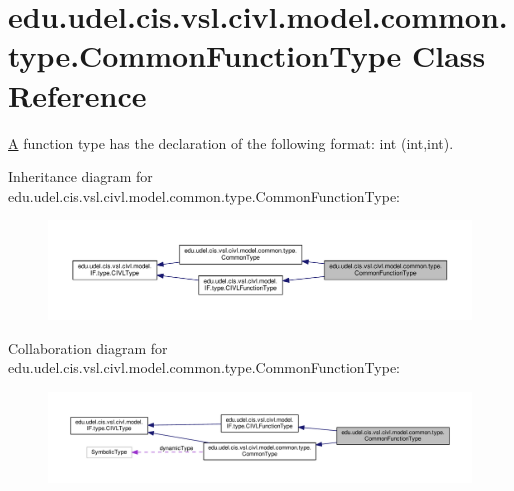 \hypertarget{classedu_1_1udel_1_1cis_1_1vsl_1_1civl_1_1model_1_1common_1_1type_1_1CommonFunctionType}{}\section{edu.\+udel.\+cis.\+vsl.\+civl.\+model.\+common.\+type.\+Common\+Function\+Type Class Reference}
\label{classedu_1_1udel_1_1cis_1_1vsl_1_1civl_1_1model_1_1common_1_1type_1_1CommonFunctionType}


\hyperlink{structA}{A} function type has the declaration of the following format\+: int (int,int).  




Inheritance diagram for edu.\+udel.\+cis.\+vsl.\+civl.\+model.\+common.\+type.\+Common\+Function\+Type\+:
\nopagebreak
\begin{figure}[H]
\begin{center}
\leavevmode
\includegraphics[width=350pt]{classedu_1_1udel_1_1cis_1_1vsl_1_1civl_1_1model_1_1common_1_1type_1_1CommonFunctionType__inherit__graph}
\end{center}
\end{figure}


Collaboration diagram for edu.\+udel.\+cis.\+vsl.\+civl.\+model.\+common.\+type.\+Common\+Function\+Type\+:
\nopagebreak
\begin{figure}[H]
\begin{center}
\leavevmode
\includegraphics[width=350pt]{classedu_1_1udel_1_1cis_1_1vsl_1_1civl_1_1model_1_1common_1_1type_1_1CommonFunctionType__coll__graph}
\end{center}
\end{figure}
